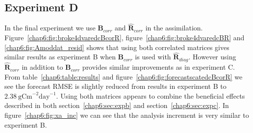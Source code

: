 \subsection{Experiment D}

In the final experiment we use $\textbf{B}_{corr}$ and $\hat{\textbf{R}}_{corr}$ in the assimilation. Figure~\ref{chap6:fig:broke4dvaredcBcorR}, figure~\ref{chap6:fig:broke4dvaredcBR} and \ref{chap6:fig:Amoddat_resid} shows that using both correlated matrices gives similar results as experiment B when $\textbf{B}_{corr}$ is used with $\hat{\textbf{R}}_{diag}$. However using $\hat{\textbf{R}}_{corr}$ in addition to $\textbf{B}_{corr}$ provides similar improvements as in experiment C. From table~\ref{chap6:table:results} and figure~\ref{chap6:fig:forecastscatedcBcorR} we see the forecast RMSE is slightly reduced from results in experiment B to $2.38 ~\text{gCm}^{-2}\text{day}^{-1}$. Using both matrices appears to combine the beneficial effects described in both section~\ref{chap6:sec:expb} and section~\ref{chap6:sec:expc}. In figure~\ref{chap6:fig:xa_inc} we can see that the analysis increment is very similar to experiment B.

